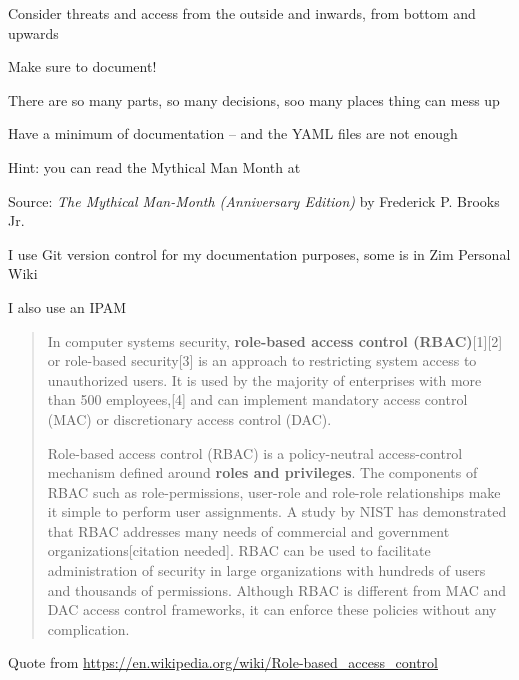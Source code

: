 \documentclass[Screen16to9,17pt]{foils}
\begin{document}
Consider threats and access from the outside and inwards, from bottom and upwards




\begin{list2}
\item Make sure to document!
\item There are so many parts, so many decisions, soo many places thing can mess up
\item Have a minimum of documentation -- and the YAML files are not enough
\item Hint:  you can read the Mythical Man Month at 
\end{list2}


Source: \emph{The Mythical Man-Month (Anniversary Edition)}
by Frederick P. Brooks Jr.

\begin{list2}
\item I use Git version control for my documentation purposes, some is in Zim Personal Wiki 
\item I also use an IPAM 
\end{list2}


\begin{quote}
In computer systems security, {\bf role-based access control (RBAC)}[1][2] or role-based security[3] is an approach to restricting system access to unauthorized users. It is used by the majority of enterprises with more than 500 employees,[4] and can implement mandatory access control (MAC) or discretionary access control (DAC).

Role-based access control (RBAC) is a policy-neutral access-control mechanism defined around {\bf roles and privileges}. The components of RBAC such as role-permissions, user-role and role-role relationships make it simple to perform user assignments. A study by NIST has demonstrated that RBAC addresses many needs of commercial and government organizations[citation needed]. RBAC can be used to facilitate administration of security in large organizations with hundreds of users and thousands of permissions. Although RBAC is different from MAC and DAC access control frameworks, it can enforce these policies without any complication.
\end{quote}
Quote from \url{https://en.wikipedia.org/wiki/Role-based_access_control}
\end{document}
